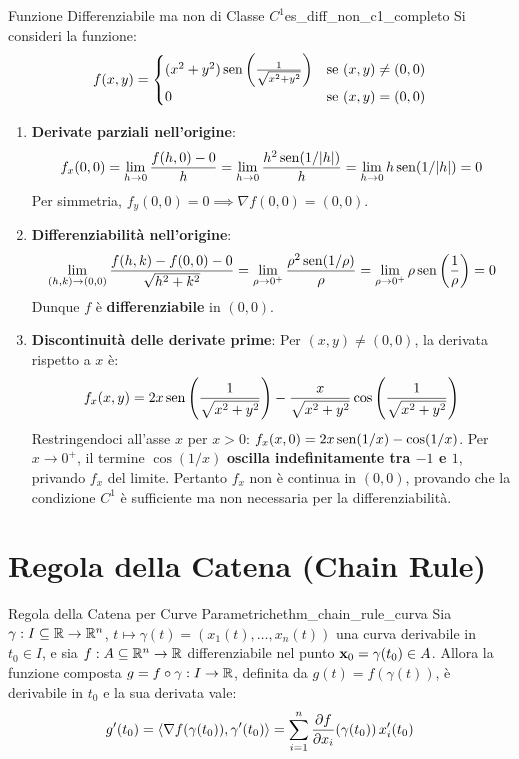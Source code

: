 \begin{esempio}{Funzione Differenziabile ma non di Classe $C^1$}{es_diff_non_c1_completo}
Si consideri la funzione:
\[
f(x,y) = \begin{cases} (x^2 + y^2) \operatorname{sen}\left( \frac{1}{\sqrt{x^2+y^2}} \right) & \text{se } (x,y) \neq (0,0) \\ 0 & \text{se } (x,y) = (0,0) \end{cases}
\]
\begin{enumerate}
    \item \textbf{Derivate parziali nell'origine}:
    \[
    f_x(0,0) = \lim_{h \to 0} \frac{f(h,0) - 0}{h} = \lim_{h \to 0} \frac{h^2 \operatorname{sen}(1/\lvert h\rvert)}{h} = \lim_{h \to 0} h \operatorname{sen}(1/\lvert h\rvert) = 0
    \]
    Per simmetria, $f_y(0,0) = 0 \implies \nabla f(0,0) = (0,0)$.
    \item \textbf{Differenziabilità nell'origine}:
    \[
    \lim_{(h,k) \to (0,0)} \frac{f(h,k) - f(0,0) - 0}{\sqrt{h^2+k^2}} = \lim_{\rho \to 0^+} \frac{\rho^2 \operatorname{sen}(1/\rho)}{\rho} = \lim_{\rho \to 0^+} \rho \operatorname{sen}\left(\frac{1}{\rho}\right) = 0
    \]
    Dunque $f$ è \textbf{differenziabile} in $(0,0)$.
    \item \textbf{Discontinuità delle derivate prime}:
    Per $(x,y) \neq (0,0)$, la derivata rispetto a $x$ è:
    \[
    f_x(x,y) = 2x \operatorname{sen}\left(\frac{1}{\sqrt{x^2+y^2}}\right) - \frac{x}{\sqrt{x^2+y^2}} \cos\left(\frac{1}{\sqrt{x^2+y^2}}\right)
    \]
    Restringendoci all'asse $x$ per $x > 0$: $f_x(x,0) = 2x \operatorname{sen}(1/x) - \cos(1/x)$.
    Per $x \to 0^+$, il termine $\cos(1/x)$ \textbf{oscilla indefinitamente tra $-1$ e $1$}, privando $f_x$ del limite. Pertanto $f_x$ non è continua in $(0,0)$, provando che la condizione $C^1$ è sufficiente ma non necessaria per la differenziabilità.
\end{enumerate}
\end{esempio}

\section{Regola della Catena (Chain Rule)}

\begin{teorema}{Regola della Catena per Curve Parametriche}{thm_chain_rule_curva}
Sia $\gamma: I \subseteq \mathbb{R} \to \mathbb{R}^n$, $t \mapsto \gamma(t) = (x_1(t), \dots, x_n(t))$ una curva derivabile in $t_0 \in I$, e sia $f: A \subseteq \mathbb{R}^n \to \mathbb{R}$ differenziabile nel punto $\mathbf{x}_0 = \gamma(t_0) \in A$.
Allora la funzione composta $g = f \circ \gamma: I \to \mathbb{R}$, definita da $g(t) = f(\gamma(t))$, è derivabile in $t_0$ e la sua derivata vale:
\[
g'(t_0) = \langle\nabla f(\gamma(t_0)), \gamma'(t_0)\rangle = \sum_{i=1}^n \frac{\partial f}{\partial x_i}(\gamma(t_0)) \, x_i'(t_0)
\]
\end{teorema}

